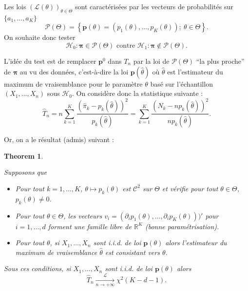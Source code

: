 \documentclass[
]{book}
\providecommand{\tightlist}{%
  \setlength{\itemsep}{0pt}\setlength{\parskip}{0pt}}
\newtheorem{theorem}{Theorem}[chapter]
\theoremstyle{definition}
\theoremstyle{definition}
\theoremstyle{definition}
\theoremstyle{definition}
\theoremstyle{remark}
\begin{document}
Les lois \((\mathcal L(\theta))_{\theta\in\Theta}\) sont caractérisées par les vecteurs de probabilités sur \(\{a_1,\ldots,a_K\}\)
\[
\mathcal P(\Theta)=\left\{ \mathbf{p}(\theta)=(p_1(\theta),\ldots,p_K(\theta));\ \theta\in\Theta \right\}.
\]
On souhaite donc tester
\[
\mathcal{H}_0 : \boldsymbol{\pi}\in \mathcal P(\Theta)  \textrm{ contre }   \mathcal{H}_1 : \boldsymbol{\pi}\notin {\mathcal P}(\Theta).
\]

L'idée du test est de remplacer \(\mathbf{p}^0\) dans \(T_n\) par la loi de \(\mathcal P(\Theta)\) ``la plus proche'' de \(\boldsymbol{\pi}\) au vu des données, c'est-à-dire la loi \(\mathbf{p}(\hat\theta)\) où \(\hat\theta\) est l'estimateur du maximum de vraisemblance pour le paramètre \(\theta\) basé sur l'échantillon \((X_1,\ldots,X_n)\) sous \(\mathcal{H}_0\). On considère donc la statistique suivante :
\[
\hat T_n = n \sum_{k=1}^K \frac{\left(\hat{\pi}_k - p_k(\hat\theta)\right)^2}{p_k(\hat\theta)} = \sum_{k=1}^K \frac{\left(N_k - n p_k(\hat\theta)\right)^2}{n p_k(\hat\theta)}.
\]

Or, on a le résultat (admis) suivant :

\begin{theorem}
\protect\hypertarget{thm:unlabeled-div-45}{}\label{thm:unlabeled-div-45}

Supposons que

\begin{itemize}
\tightlist
\item
  Pour tout \(k=1,\ldots,K\), \(\theta\mapsto p_k(\theta)\) est \({\mathcal C}^2\) sur \(\Theta\) et vérifie pour tout \(\theta\in \Theta\),
  \(p_k(\theta)\neq 0\).
\item
  Pour tout \(\theta\in \Theta\), les vecteurs
  \(v_i=\left(\partial_i p_1(\theta), \ldots,\partial_i p_K(\theta)\right))'\) pour
  \(i=1,\ldots, d\) forment une famille libre de \(\mathbb{R}^K\) (bonne
  paramétrisation).
\item
  Pour tout \(\theta\), si \(X_1,\ldots, X_n\) sont i.i.d. de loi \(\mathbf{p}(\theta)\)
  alors l'estimateur du maximum de vraisemblance \(\hat \theta\) est consistant
  vers \(\theta\).
\end{itemize}

Sous ces conditions, si \(X_1,\ldots, X_n\) sont i.i.d. de loi \(\mathbf{p}(\theta)\)
alors
\[
    \hat T_n \underset{n\rightarrow +\infty}{\stackrel{\mathcal L}{\longrightarrow}}\chi^2(K-d-1).
\]

\end{theorem}
\end{document}
